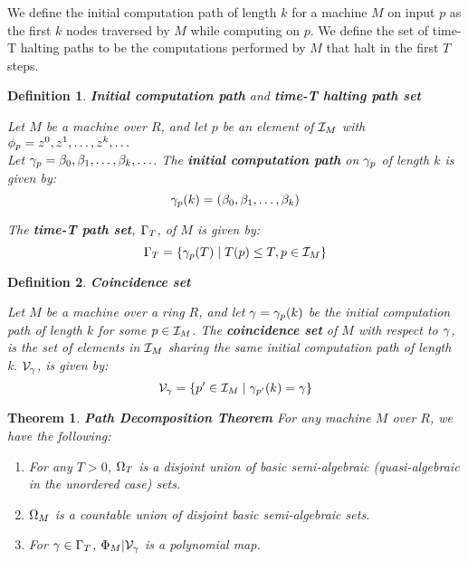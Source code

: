 \documentclass[twoside]{article}
\newtheorem{theorem}{Theorem}[section]
\newtheorem{definition}{Definition}[section]
\begin{document}
  We define the initial computation path of length $k$ for a machine
  $M$ on input $p$ as the first $k$ nodes traversed by $M$ while computing
  on $p$.  We define the set of time-T halting paths to be the computations
  performed by $M$ that halt in the first $T$ steps.

  \begin{definition}{\textbf{Initial computation path} and \textbf{time-T halting path set}}

    Let $M$ be a machine over $R$, and let $p$ be an element of
    $\mathcal{I}_M$ with $\phi_p = z^0, z^1, \ldots, z^k, \ldots$ \\
    Let $\gamma_p = \beta_0, \beta_1, \ldots, \beta_k, \ldots$.  
    The \textbf{initial computation path} on $\gamma_p$ of
    length $k$ is given by: 
    $$\gamma_p(k) = (\beta_0, \beta_1, \ldots,\beta_k)$$

    The \textbf{time-T path set}, $\Gamma_{T}$, of $M$ is given by:
    $$\Gamma_{T} = \{\gamma_p(T) \mid T(p) \leq T, p \in \mathcal{I}_M\}$$

  \end{definition}
  
  \begin{definition}{\textbf{Coincidence set}}

    Let $M$ be a machine over a ring $R$, and let $\gamma = \gamma_{p}(k)$ be
    the initial computation path of length $k$ for some $p \in
    \mathcal{I}_M$. The \textbf{coincidence set} of $M$ with respect to $\gamma$, is the
    set of elements in $\mathcal{I}_M$ sharing the same initial computation path of length k.
    $\mathcal{V}_{\gamma}$, is given by:
    $$\mathcal{V}_{\gamma} = 
    \{p' \in \mathcal{I}_M \mid \gamma_{p'}(k) = \gamma\}$$
    
    \emph{}

  \end{definition}

  \begin{theorem}{\textbf{Path Decomposition Theorem}}
    For any machine $M$ over $R$, we have the following:

    \begin{enumerate}
    \item For any $T > 0$, $\Omega_T$ is a disjoint union of basic
      semi-algebraic (quasi-algebraic in the unordered case) sets.

    \item $\Omega_M$ is a countable union of disjoint basic
      semi-algebraic sets.

    \item For $\gamma \in \Gamma_{T}$,
      $\Phi_M|\mathcal{V}_{\gamma}$ is a polynomial map.
    \end{enumerate}
  \end{theorem}
\end{document}
